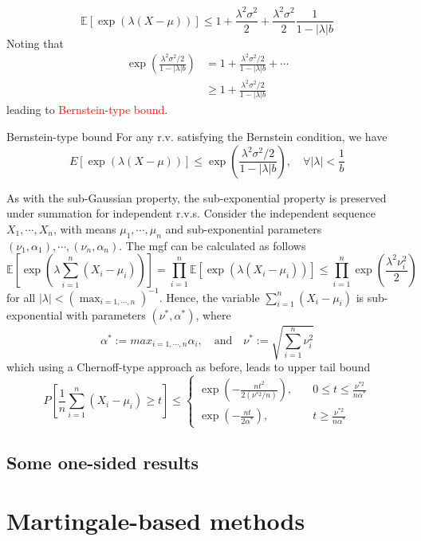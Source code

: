 \documentclass[10pt,handout,english]{beamer}
\newcommand{\E}{\mathbb{E}}
\newcommand{\1}{\mathbbm{1}}
\begin{document}
\begin{frame}[allowframebreaks]
\[
\E[\exp(\lambda(X-\mu))]\leq 1+\frac{\lambda^2\sigma^2}{2}+\frac{\lambda^2\sigma^2}{2}\frac{1}{1-\lvert\lambda\rvert b}
\]
Noting that 
\begin{align*}
\exp\left(\frac{\lambda^2\sigma^2/2}{1-\lvert\lambda\rvert b}\right)&=1+\frac{\lambda^2\sigma^2/2}{1-\lvert\lambda\rvert b}+\cdots\\
&\geq 1+\frac{\lambda^2\sigma^2/2}{1-\lvert\lambda\rvert b}
\end{align*}
leading to \textcolor{red}{Bernstein-type bound}.
\begin{block}{Bernstein-type bound}
For any r.v. satisfying the Bernstein condition, we have
\[
E[\exp(\lambda(X-\mu))]\leq \exp\left(\frac{\lambda^2\sigma^2/2}{1-\lvert\lambda\rvert b}\right),\quad \forall\lvert\lambda\rvert<\frac{1}{b}
\]
\end{block}

As with the sub-Gaussian property, the sub-exponential property is preserved under summation for independent r.v.s. Consider the independent sequence $X_1,\cdots,X_n$, with means $\mu_1,\cdots,\mu_n$ and sub-exponential parameters $(\nu_1,\alpha_1),\cdots,(\nu_n,\alpha_n)$. The mgf can be calculated as follows
\[
\E\left[\exp\left(\lambda\sum_{i=1}^n(X_i-\mu_i)\right)\right]=\prod\limits_{i=1}^n\E[\exp(\lambda(X_i-\mu_i))]\leq \prod\limits_{i=1}^n\exp\left(\frac{\lambda^2\nu_i^2}{2}\right)
\]
for all $\lvert\lambda\rvert<(\max_{i=1,\cdots,n})^{-1}$. Hence, the variable $\sum_{i=1}^n(X_i-\mu_i)$ is sub-exponential with parameters $(\nu^*,\alpha^*)$, where 
\[
\alpha^*:=max_{i=1,\cdots,n}\alpha_i,\quad\text{and}\quad\nu^*:=\sqrt{\sum\limits_{i=1}^{n}\nu_i^2}
\]
which  using a Chernoff-type approach as before, leads to upper tail bound
\[
P\left[\frac{1}{n}\sum\limits_{i=1}^{n}(X_i-\mu_i)\geq t\right]\leq
\begin{cases}
\exp\left(-\frac{nt^2}{2(\nu^{*2}/n)}\right),\quad &0\leq t\leq \frac{\nu^{*2}}{n\alpha^*}\\
\exp\left(-\frac{nt}{2\alpha^{*}}\right),\quad &t\geq \frac{\nu^{*2}}{n\alpha^*}
\end{cases}
\]
\end{frame}


\subsection{Some one-sided results}

\section{Martingale-based methods}
\end{document}
